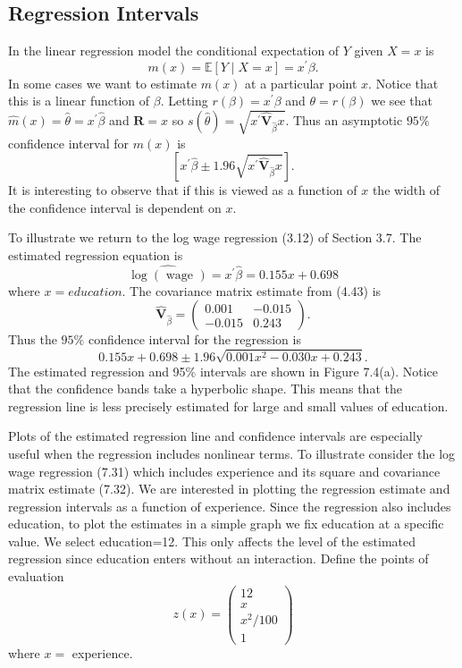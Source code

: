 \documentclass[10pt]{article}
\begin{document}
\subsection{Regression Intervals}
In the linear regression model the conditional expectation of $Y$ given $X=x$ is
$$
m(x)=\mathbb{E}[Y \mid X=x]=x^{\prime} \beta .
$$
In some cases we want to estimate $m(x)$ at a particular point $x$. Notice that this is a linear function of $\beta$. Letting $r(\beta)=x^{\prime} \beta$ and $\theta=r(\beta)$ we see that $\hat{m}(x)=\widehat{\theta}=x^{\prime} \widehat{\beta}$ and $\boldsymbol{R}=x$ so $s(\widehat{\theta})=\sqrt{x^{\prime} \widehat{\boldsymbol{V}}_{\widehat{\beta}} x}$. Thus an asymptotic $95 \%$ confidence interval for $m(x)$ is
$$
\left[x^{\prime} \widehat{\beta} \pm 1.96 \sqrt{x^{\prime} \widehat{\boldsymbol{V}}_{\widehat{\beta}} x}\right] .
$$
It is interesting to observe that if this is viewed as a function of $x$ the width of the confidence interval is dependent on $x$.

To illustrate we return to the log wage regression (3.12) of Section 3.7. The estimated regression equation is
$$
\widehat{\log (\text { wage })}=x^{\prime} \widehat{\beta}=0.155 x+0.698
$$
where $x=e d u c a t i o n$. The covariance matrix estimate from (4.43) is
$$
\widehat{\boldsymbol{V}}_{\widehat{\beta}}=\left(\begin{array}{cc}
0.001 & -0.015 \\
-0.015 & 0.243
\end{array}\right) .
$$
Thus the $95 \%$ confidence interval for the regression is
$$
0.155 x+0.698 \pm 1.96 \sqrt{0.001 x^{2}-0.030 x+0.243} .
$$
The estimated regression and 95\% intervals are shown in Figure 7.4(a). Notice that the confidence bands take a hyperbolic shape. This means that the regression line is less precisely estimated for large and small values of education.

Plots of the estimated regression line and confidence intervals are especially useful when the regression includes nonlinear terms. To illustrate consider the log wage regression (7.31) which includes experience and its square and covariance matrix estimate (7.32). We are interested in plotting the regression estimate and regression intervals as a function of experience. Since the regression also includes education, to plot the estimates in a simple graph we fix education at a specific value. We select education=12. This only affects the level of the estimated regression since education enters without an interaction. Define the points of evaluation
$$
z(x)=\left(\begin{array}{c}
12 \\
x \\
x^{2} / 100 \\
1
\end{array}\right)
$$
where $x=$ experience.
\end{document}
